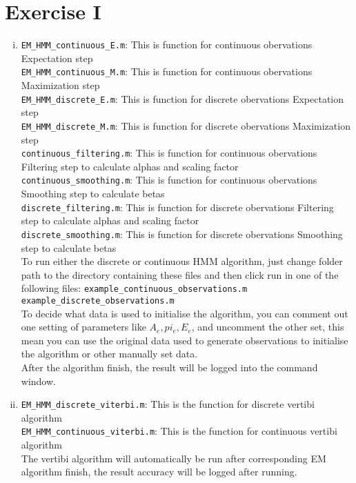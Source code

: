 \documentclass[12pt,twoside]{article}
\begin{document}



\section{Exercise I}
\begin{enumerate}[(i)]
\item
\verb|EM_HMM_continuous_E.m|: This is function for continuous obervations Expectation step\\
\verb|EM_HMM_continuous_M.m|: This is function for continuous obervations Maximization step\\
\verb|EM_HMM_discrete_E.m|: This is function for discrete obervations Expectation step\\
\verb|EM_HMM_discrete_M.m|: This is function for discrete obervations Maximization step\\
\verb|continuous_filtering.m|: This is function for continuous obervations Filtering step to calculate alphas and scaling factor\\
\verb|continuous_smoothing.m|: This is function for continuous obervations Smoothing step to calculate betas\\
\verb|discrete_filtering.m|: This is function for discrete obervations Filtering step to calculate alphas and scaling factor\\
\verb|discrete_smoothing.m|: This is function for discrete obervations Smoothing step to calculate betas\\
To run either the discrete or continuous HMM algorithm, just change folder path to the directory containing these files and then click run in one of the following files:
\verb|example_continuous_observations.m|\\
\verb|example_discrete_observations.m|\\
To decide what data is used to initialise the algorithm, you can comment out one setting of parameters like $A_e, pi_e, E_e$, and uncomment the other set, this mean you can use the original data used to generate observations to initialise the algorithm or other manually set data.\\
After the algorithm finish, the result will be logged into the command window.
\item
\verb|EM_HMM_discrete_viterbi.m|: This is the function for discrete vertibi algorithm\\
\verb|EM_HMM_continuous_viterbi.m|: This is the function for continuous vertibi algorithm\\
The vertibi algorithm will automatically be run after corresponding EM algorithm finish, the result accuracy will be logged after running.
\end{enumerate}
\end{document}
